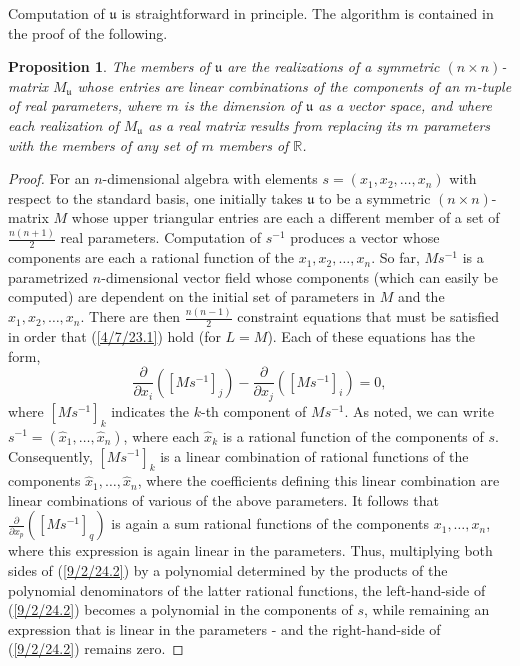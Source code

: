 \documentclass{amsart}
\numberwithin{equation}{section}
\newtheorem{proposition}[theorem]{Proposition}
\theoremstyle{definition}
\numberwithin{theorem}{section}
\begin{document}
Computation of $\mathfrak{u}$ is straightforward in principle.  The algorithm is contained in the proof of the following. 

\begin{proposition}\label{9/2/24.1} The members of $\mathfrak{u}$ are the realizations of a symmetric $(n\times n)$-matrix $M_{\mathfrak{u}}$ whose entries are linear combinations of the components of an $m$-tuple of real parameters, where $m$ is the dimension of $\mathfrak{u}$ as a vector space, and where each realization of $M_{\mathfrak{u}}$ as a real matrix results from replacing its $m$ parameters with the members of any set of $m$ members of $\mathbb{R}$.   
\end{proposition}

\begin{proof} For an $n$-dimensional algebra with elements $s = (x_1,x_2,\dots,x_n)$ with respect to the standard basis, one initially takes $\mathfrak{u}$ to be a symmetric $(n\times n)$-matrix $M$ whose upper triangular entries are each a different member of a set of $\frac{n(n+1)}{2}$ real parameters.  Computation of $s^{-1}$ produces a vector whose components are each a rational function of the $x_1,x_2,\dots,x_n$.  So far, $Ms^{-1}$ is a parametrized \mbox{$n$-dimensional} vector field whose components (which can easily be computed) are dependent on the initial set of parameters in $M$ and the $x_1,x_2,\dots,x_n$.  There are then $\frac{n(n-1)}{2}$ constraint equations that must be satisfied in order that (\ref{4/7/23.1}) hold (for $L=M$).  Each of these equations has the form, \begin{equation}\label{9/2/24.2} \frac{\partial}{\partial x_i}([Ms^{-1}]_j) - \frac{\partial}{\partial x_j}([Ms^{-1}]_i) = 0,\end{equation} where $[Ms^{-1}]_k$ indicates the $k$-th component of $Ms^{-1}$.  As noted, we can write $s^{-1} = (\hat{x}_1,\dots,\hat{x}_n)$, where each $\hat{x}_k$ is a rational function of the components of $s$.  Consequently, $[Ms^{-1}]_k$ is a linear combination of rational functions of the components $\hat{x}_1,\dots,\hat{x}_n$, where the coefficients defining this linear combination are linear combinations of various of the above parameters.  It follows that $\frac{\partial}{\partial x_p}([Ms^{-1}]_q)$ is again a sum rational functions of the components $x_1,\dots,x_n$, where this expression is again linear in the parameters.  Thus, multiplying both sides of (\ref{9/2/24.2}) by a polynomial determined by the products of the polynomial denominators of the latter rational functions, the left-hand-side of (\ref{9/2/24.2}) becomes a polynomial in the components of $s$, while remaining an expression that is linear in the parameters - and the right-hand-side of (\ref{9/2/24.2}) remains zero.

\end{proof}
\end{document}
